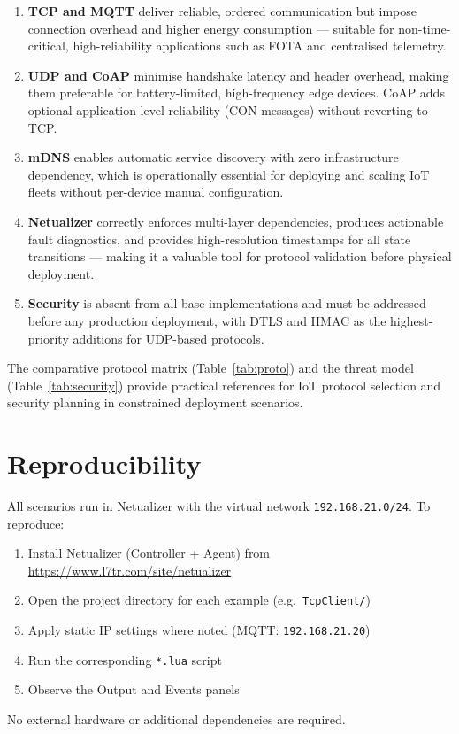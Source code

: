 \documentclass[12pt,a4paper]{article}
\begin{document}
\begin{enumerate}
  \item \textbf{TCP and MQTT} deliver reliable, ordered communication but
    impose connection overhead and higher energy consumption --- suitable for
    non-time-critical, high-reliability applications such as FOTA and
    centralised telemetry.

  \item \textbf{UDP and CoAP} minimise handshake latency and header overhead,
    making them preferable for battery-limited, high-frequency edge devices.
    CoAP adds optional application-level reliability (CON messages) without
    reverting to TCP.

  \item \textbf{mDNS} enables automatic service discovery with zero
    infrastructure dependency, which is operationally essential for deploying
    and scaling IoT fleets without per-device manual configuration.

  \item \textbf{Netualizer} correctly enforces multi-layer dependencies,
    produces actionable fault diagnostics, and provides high-resolution
    timestamps for all state transitions --- making it a valuable tool for
    protocol validation before physical deployment.

  \item \textbf{Security} is absent from all base implementations and must
    be addressed before any production deployment, with DTLS and HMAC as the
    highest-priority additions for UDP-based protocols.
\end{enumerate}

The comparative protocol matrix (Table~\ref{tab:proto}) and the threat model
(Table~\ref{tab:security}) provide practical references for IoT protocol
selection and security planning in constrained deployment scenarios.

\section*{Reproducibility}
\label{sec:repro}

All scenarios run in Netualizer with the virtual network \texttt{192.168.21.0/24}.
To reproduce:
\begin{enumerate}[nosep]
  \item Install Netualizer (Controller + Agent) from \url{https://www.l7tr.com/site/netualizer}
  \item Open the project directory for each example (e.g.\ \texttt{TcpClient/})
  \item Apply static IP settings where noted (MQTT: \texttt{192.168.21.20})
  \item Run the corresponding \texttt{*.lua} script
  \item Observe the Output and Events panels
\end{enumerate}
No external hardware or additional dependencies are required.
\end{document}
